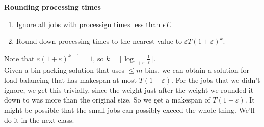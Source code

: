 \documentclass[a4paper]{article}
\newcommand{\nl}{\vspace{0.2cm}\\}
\newcommand{\eps}{\varepsilon}
\begin{document}
\textbf{Rounding processing times}\nl
\begin{enumerate}
    \item Ignore all jobs with processign times less than $\epsilon T$.
    \item Round down processing times to the nearest value to $\eps T (1 + \eps)^k$.
\end{enumerate}

Note that $\eps (1 + \eps)^{k-1} = 1$, so $k = \lceil\log_{1 + \eps} \frac{1}{\eps} \rceil$.\nl
Given a bin-packing solution that uses $\le m$ bins, we can obtain a solution for load balancing that has makespan at most $T(1 + \eps)$. For the jobs that we didn't ignore, we get this trivially,
since the weight just after the weight we rounded it down to was more than the original size. So we get a makespan of $T(1 + \eps)$. It might be possible that the small jobs can possibly exceed the
whole thing. We'll do it in the next class.
\end{document}
